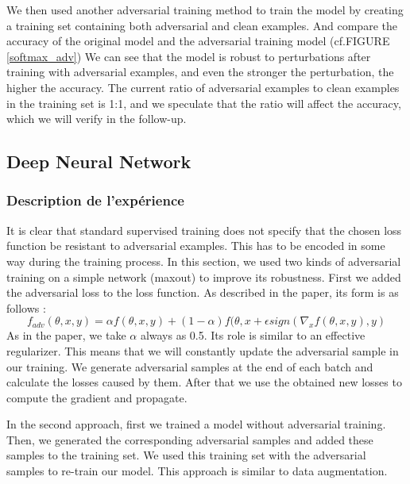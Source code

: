 We then used another adversarial training method to train the model by creating a training set containing both adversarial and clean examples. And compare the accuracy of the original model and the adversarial training model (cf.FIGURE \ref{softmax_adv}) We can see that the model is robust to perturbations after training with adversarial examples, and even the stronger the perturbation, the higher the accuracy. The current ratio of adversarial examples to clean examples in the training set is 1:1, and we speculate that the ratio will affect the accuracy, which we will verify in the follow-up.



\subsection{Deep Neural Network}
\subsubsection{Description de l'expérience}
It is clear that standard supervised training does not specify that the chosen loss function be resistant to adversarial examples. This has to be encoded in some way during the training process. In this section, we used two kinds of adversarial training on a simple network (maxout) to improve its robustness. First we added the adversarial loss to the loss function. As described in the paper, its form is as follows :
$$ f_{adv}(\theta,x,y) = \alpha f(\theta,x,y) +(1-\alpha )f(\theta,x+\epsilon sign(\nabla_{x}f(\theta,x,y),y) $$
As in the paper, we take $\alpha$ always as 0.5. Its role is similar to an effective regularizer. This means that we will constantly update the adversarial sample in our training. We generate adversarial samples at the end of each batch and calculate the losses caused by them. After that we use the obtained new losses to compute the gradient and propagate.

In the second approach, first we trained a model without adversarial training. Then, we generated the corresponding adversarial samples and added these samples to the training set. We used this training set with the adversarial samples to re-train our model. This approach is similar to data augmentation. 



